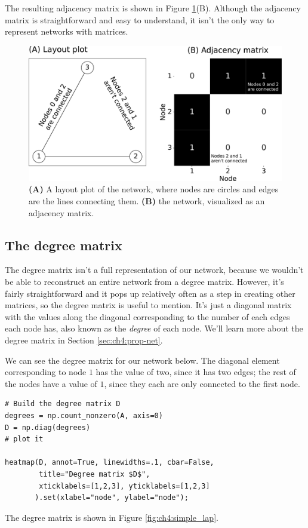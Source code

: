 The resulting adjacency matrix is shown in Figure \ref{fig:ch4:basic_mtxs}(B). Although the adjacency matrix is straightforward and easy to understand, it isn't the only way to represent networks with matrices.

\begin{figure}[h]
    \centering
    \includegraphics[width=0.8\linewidth]{representations/ch4/Images/basic_mtxs.png}
    \caption[Plotting a simple network as a layout plot and adjacency matrix heatmap]{\textbf{(A)} A layout plot of the network, where nodes are circles and edges are the lines connecting them. \textbf{(B)} the network, visualized as an adjacency matrix.}
    \label{fig:ch4:basic_mtxs}
\end{figure}

\subsection{The degree matrix}

The degree matrix isn't a full representation of our network, because we wouldn't be able to reconstruct an entire network from a degree matrix. However, it's fairly straightforward and it pops up relatively often as a step in creating other matrices, so the degree matrix is useful to mention. It's just a diagonal matrix with the values along the diagonal corresponding to the number of each edges each node has, also known as the \textit{degree} of each node. We'll learn more about the degree matrix in Section \ref{sec:ch4:prop-net}.

We can see the degree matrix for our network below. The diagonal element corresponding to node $1$ has the value of two, since it has two edges; the rest of the nodes have a value of $1$, since they each are only connected to the first node.

\begin{lstlisting}[style=python]
# Build the degree matrix D
degrees = np.count_nonzero(A, axis=0)
D = np.diag(degrees)
# plot it

heatmap(D, annot=True, linewidths=.1, cbar=False, 
        title="Degree matrix $D$", 
        xticklabels=[1,2,3], yticklabels=[1,2,3]
       ).set(xlabel="node", ylabel="node");

\end{lstlisting}
The degree matrix is shown in Figure \ref{fig:ch4:simple_lap}.


